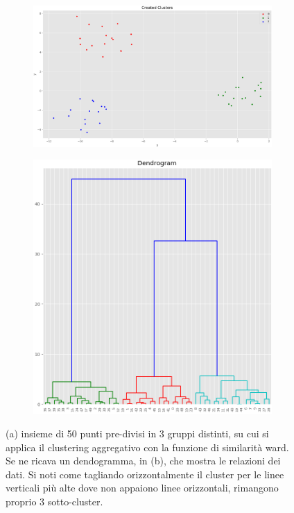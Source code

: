 \documentclass{llncs}
\begin{document}
	\begin{figure}[h]
		\centering
		\begin{subfigure}[b]{\textwidth}
		   	\includegraphics[width=\linewidth]{immagini/created_cluster_dend_ex.png}
		   	\label{fig:1} 
		\end{subfigure}
		
		\begin{subfigure}[b]{\textwidth}
			\centering
		   	\includegraphics[scale=0.5]{immagini/dendrogam_example.png}
		   	\label{fig:2}
		\end{subfigure}
		\caption{(a) insieme di 50 punti pre-divisi in 3 gruppi distinti, su cui si applica il clustering aggregativo con la funzione di 
		similarità ward. Se ne ricava un dendogramma, in (b), che mostra le relazioni dei dati. Si noti come tagliando orizzontalmente il cluster per le linee verticali più alte dove non appaiono linee orizzontali, rimangono proprio 3 sotto-cluster.}
		\label{ex:dendrogram}
	\end{figure}
\end{document}
